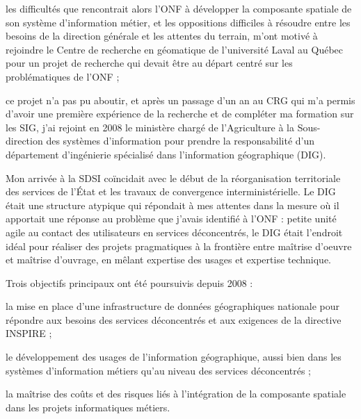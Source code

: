 \item les difficultés que rencontrait alors l'ONF
      à développer la composante spatiale de son
      système d'information métier, et les oppositions
      difficiles à résoudre entre les besoins de la direction générale
      et les attentes du terrain, m'ont motivé à rejoindre
      le Centre de recherche en géomatique de l'université Laval au Québec
      pour un projet de recherche qui devait être au départ
      centré sur les problématiques de l'ONF ;

\item ce projet n'a pas pu aboutir,
      et après un passage d'un an au CRG qui m'a permis
      d'avoir une première expérience de la recherche et de
      compléter ma formation sur les SIG, j'ai rejoint en 2008 le ministère
      chargé de l'Agriculture à la Sous-direction des systèmes 
      d'information pour prendre la responsabilité
      d'un département d'ingénierie spécialisé dans
      l'information géographique (DIG).

\stopitemize

Mon arrivée à la SDSI
coïncidait avec le début de la réorganisation territoriale
des services de l'État et les travaux de convergence
interministérielle.
Le DIG était une structure atypique qui répondait à mes attentes
dans la mesure où il apportait une réponse au problème que j'avais identifié à l'ONF :
petite unité agile au contact des utilisateurs en services déconcentrés,
le DIG était l'endroit idéal pour réaliser des projets pragmatiques à la frontière
entre maîtrise d'oeuvre et maîtrise d'ouvrage,
en mêlant expertise des usages et expertise technique.

Trois objectifs principaux ont été poursuivis depuis 2008 :

\startitemize

\item la mise en place d'une infrastructure
      de données géographiques nationale pour répondre aux besoins
      des services déconcentrés et aux exigences
      de la directive INSPIRE ;

\item le développement des usages de l'information géographique,
      aussi bien dans les systèmes d'information métiers
      qu'au niveau des services déconcentrés ;

\item la maîtrise des coûts et des risques
      liés à l'intégration de la composante spatiale
      dans les projets informatiques métiers.

